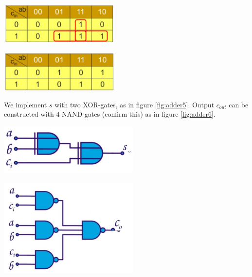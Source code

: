 \begin{minipage}{.4\textwidth}
	\centering
	\includegraphics[width=6cm]{figures/ch13/adder3.jpg}
	\label{fig:adder3}
\end{minipage}%
\begin{minipage}{.5\textwidth}
	\centering
	\includegraphics[width=6cm]{figures/ch13/adder4.jpg}
	\label{fig:adder4}
\end{minipage}

We implement $s$ with two XOR-gates, as in figure \ref{fig:adder5}. Output $c_{out}$ can be constructed with $4$ NAND-gates (confirm this) as in figure \ref{fig:adder6}.

\begin{minipage}{.5\textwidth}
	\centering
	\includegraphics[width=7cm]{figures/ch13/adder6.jpg}
	\label{fig:adder5}
\end{minipage}%
\begin{minipage}{.5\textwidth}
	\centering
	\includegraphics[width=7cm]{figures/ch13/adder5.jpg}
	\label{fig:adder6}
\end{minipage}

